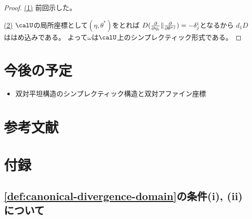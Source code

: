 \documentclass[report]{jlreq}
\begin{document}
\begin{proof}
    \uline{(1)} \quad
    前回示した。

    \uline{(2)} \quad
    $\calU$の局所座標として$(\eta, \theta^*)$をとれば
    $D(\tdeldel{\eta_i} \| \tdeldel{\theta^{*j}}) = - \delta_j^i$となるから
    $d_1 D$ははめ込みである。
    よって$\omega$は$\calU$上のシンプレクティック形式である。
\end{proof}

\begin{example}[$\R^n$の場合]
    \TODO{}
\end{example}

%
\section*{今後の予定}

\begin{itemize}
    \item 双対平坦構造のシンプレクティック構造と双対アファイン座標
\end{itemize}

%
\section*{参考文献}


\nocite{amari_information_2016}
\nocite{_bayes_2020}

{
    \renewcommand{\bibsection}{}
    
    
}

%
\newpage
\appendix
\renewcommand\thesection{\Alph{section}}
\setcounter{section}{0}
\section{付録}

\subsection{\cref{def:canonical-divergence-domain}の条件(i), (ii)について}
\end{document}
